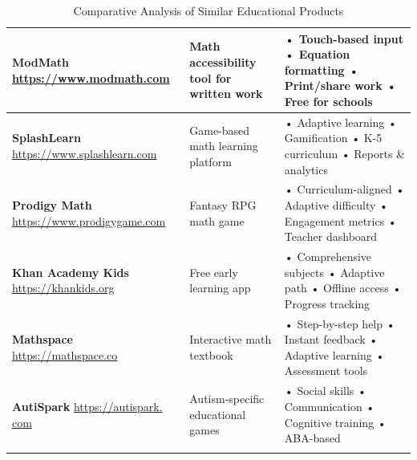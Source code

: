 \documentclass[12pt, a4paper]{article}
\begin{document}
\begin{longtable}{|>{\raggedright}p{5cm}|>{\raggedright}p{4cm}|>{\raggedright\arraybackslash}p{5cm}|}
\textbf{ModMath} \newline \url{https://www.modmath.com} & Math accessibility tool for written work & • Touch-based input \newline • Equation formatting \newline • Print/share work \newline • Free for schools \\
\hline

\textbf{SplashLearn} \newline \url{https://www.splashlearn.com} & Game-based math learning platform & • Adaptive learning \newline • Gamification \newline • K-5 curriculum \newline • Reports \& analytics \\
\hline

\textbf{Prodigy Math} \newline \url{https://www.prodigygame.com} & Fantasy RPG math game & • Curriculum-aligned \newline • Adaptive difficulty \newline • Engagement metrics \newline • Teacher dashboard \\
\hline

\textbf{Khan Academy Kids} \newline \url{https://khankids.org} & Free early learning app & • Comprehensive subjects \newline • Adaptive path \newline • Offline access \newline • Progress tracking \\
\hline

\textbf{Mathspace} \newline \url{https://mathspace.co} & Interactive math textbook & • Step-by-step help \newline • Instant feedback \newline • Adaptive learning \newline • Assessment tools \\
\hline

\textbf{AutiSpark} \newline \url{https://autispark. com} & Autism-specific educational games & • Social skills \newline • Communication \newline • Cognitive training \newline • ABA-based \\
\hline

\caption{Comparative Analysis of Similar Educational Products}
\end{longtable}
\end{document}
